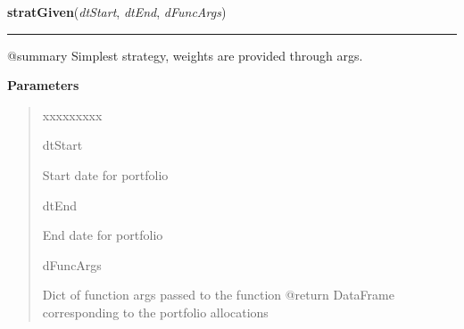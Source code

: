 \hspace{.8\funcindent}\begin{boxedminipage}{\funcwidth}

    \raggedright \textbf{stratGiven}(\textit{dtStart}, \textit{dtEnd}, \textit{dFuncArgs})

    \vspace{-1.5ex}

    \rule{\textwidth}{0.5\fboxrule}
\setlength{\parskip}{2ex}
    @summary Simplest strategy, weights are provided through args.

\setlength{\parskip}{1ex}
      \textbf{Parameters}
      \vspace{-1ex}

      \begin{quote}
        \begin{Ventry}{xxxxxxxxx}

          \item[dtStart]

          Start date for portfolio

          \item[dtEnd]

          End date for portfolio

          \item[dFuncArgs]

          Dict of function args passed to the function @return DataFrame 
          corresponding to the portfolio allocations

        \end{Ventry}

      \end{quote}

    \end{boxedminipage}

    \label{QSTK:qstkstrat:strategies:strat1OverN}

    \vspace{0.5ex}


